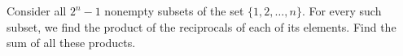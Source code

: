 Consider all $2^n - 1$ nonempty subsets of the set $\{1, 2, \ldots, n\}$. For every such subset, we find the product of the reciprocals of each of its elements. Find the sum of all these products.
